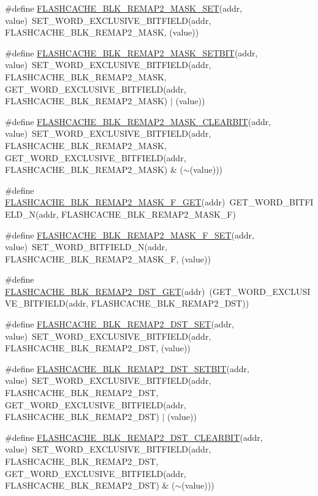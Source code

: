 \begin{DoxyCompactItemize}
\item 
\#define \hyperlink{a00549_ae5688c66d4c55b09312f5c5b01c43ec6}{FLASHCACHE\_\-BLK\_\-REMAP2\_\-MASK\_\-SET}(addr, value)~SET\_\-WORD\_\-EXCLUSIVE\_\-BITFIELD(addr, FLASHCACHE\_\-BLK\_\-REMAP2\_\-MASK, (value))
\item 
\#define \hyperlink{a00549_a9e7549a8ac9e8ac0838e718e675f733d}{FLASHCACHE\_\-BLK\_\-REMAP2\_\-MASK\_\-SETBIT}(addr, value)~SET\_\-WORD\_\-EXCLUSIVE\_\-BITFIELD(addr, FLASHCACHE\_\-BLK\_\-REMAP2\_\-MASK, GET\_\-WORD\_\-EXCLUSIVE\_\-BITFIELD(addr, FLASHCACHE\_\-BLK\_\-REMAP2\_\-MASK) $|$ (value))
\item 
\#define \hyperlink{a00549_a7c8c6c9250f8884e15d23dee40b02301}{FLASHCACHE\_\-BLK\_\-REMAP2\_\-MASK\_\-CLEARBIT}(addr, value)~SET\_\-WORD\_\-EXCLUSIVE\_\-BITFIELD(addr, FLASHCACHE\_\-BLK\_\-REMAP2\_\-MASK, GET\_\-WORD\_\-EXCLUSIVE\_\-BITFIELD(addr, FLASHCACHE\_\-BLK\_\-REMAP2\_\-MASK) \& ($\sim$(value)))
\item 
\#define \hyperlink{a00549_a9d3607cef4327d121157d8f170b2df60}{FLASHCACHE\_\-BLK\_\-REMAP2\_\-MASK\_\-F\_\-GET}(addr)~GET\_\-WORD\_\-BITFIELD\_\-N(addr, FLASHCACHE\_\-BLK\_\-REMAP2\_\-MASK\_\-F)
\item 
\#define \hyperlink{a00549_a142d746cc513b9b41dc546f582fcb255}{FLASHCACHE\_\-BLK\_\-REMAP2\_\-MASK\_\-F\_\-SET}(addr, value)~SET\_\-WORD\_\-BITFIELD\_\-N(addr, FLASHCACHE\_\-BLK\_\-REMAP2\_\-MASK\_\-F, (value))
\item 
\#define \hyperlink{a00549_ae639a816a09ae2b92f49c4bd8f978299}{FLASHCACHE\_\-BLK\_\-REMAP2\_\-DST\_\-GET}(addr)~(GET\_\-WORD\_\-EXCLUSIVE\_\-BITFIELD(addr, FLASHCACHE\_\-BLK\_\-REMAP2\_\-DST))
\item 
\#define \hyperlink{a00549_ac85b10977062ef6f73e768bf1a92008d}{FLASHCACHE\_\-BLK\_\-REMAP2\_\-DST\_\-SET}(addr, value)~SET\_\-WORD\_\-EXCLUSIVE\_\-BITFIELD(addr, FLASHCACHE\_\-BLK\_\-REMAP2\_\-DST, (value))
\item 
\#define \hyperlink{a00549_ad75b48c32207a21de8fb4755f833f038}{FLASHCACHE\_\-BLK\_\-REMAP2\_\-DST\_\-SETBIT}(addr, value)~SET\_\-WORD\_\-EXCLUSIVE\_\-BITFIELD(addr, FLASHCACHE\_\-BLK\_\-REMAP2\_\-DST, GET\_\-WORD\_\-EXCLUSIVE\_\-BITFIELD(addr, FLASHCACHE\_\-BLK\_\-REMAP2\_\-DST) $|$ (value))
\item 
\#define \hyperlink{a00549_af82769761c161366278c3a12befc3456}{FLASHCACHE\_\-BLK\_\-REMAP2\_\-DST\_\-CLEARBIT}(addr, value)~SET\_\-WORD\_\-EXCLUSIVE\_\-BITFIELD(addr, FLASHCACHE\_\-BLK\_\-REMAP2\_\-DST, GET\_\-WORD\_\-EXCLUSIVE\_\-BITFIELD(addr, FLASHCACHE\_\-BLK\_\-REMAP2\_\-DST) \& ($\sim$(value)))

\end{DoxyCompactItemize}
